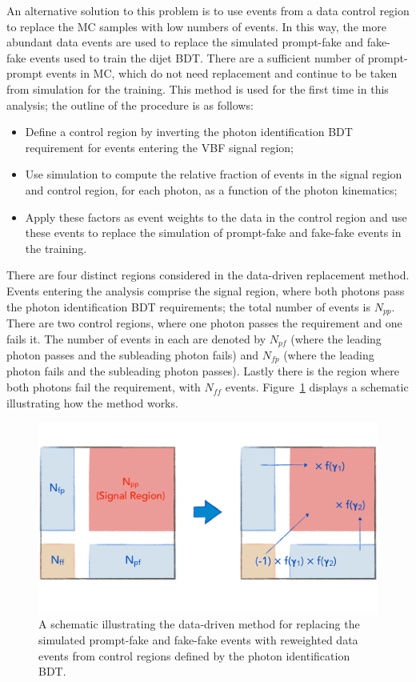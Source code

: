 An alternative solution to this problem is to use events from a data control region 
to replace the MC samples with low numbers of events.
In this way, the more abundant data events are used to replace the simulated prompt-fake and fake-fake 
events used to train the dijet BDT.
There are a sufficient number of prompt-prompt events in MC, 
which do not need replacement and continue to be taken from simulation for the training.
This method is used for the first time in this analysis;
the outline of the procedure is as follows:
\begin{itemize}
\item Define a control region by inverting the photon identification BDT requirement 
      for events entering the VBF signal region;
\item Use simulation to compute the relative fraction of events in the signal region and control region, 
      for each photon, as a function of the photon kinematics;
\item Apply these factors as event weights to the data in the control region 
      and use these events to replace the simulation of prompt-fake and fake-fake events in the training.
\end{itemize}

There are four distinct regions considered in the data-driven replacement method.
Events entering the analysis comprise the signal region, 
where both photons pass the photon identification BDT requirements;
the total number of events is $N_{pp}$.
There are two control regions, where one photon passes the requirement and one fails it.
The number of events in each are denoted by $N_{pf}$ 
(where the leading photon passes and the subleading photon fails) and $N_{fp}$ 
(where the leading photon fails and the subleading photon passes).
Lastly there is the region where both photons fail the requirement, with $N_{ff}$ events.
Figure~\ref{fig:cat_DDschematic} displays a schematic illustrating how the method works.

\begin{figure}
  \centering
  \includegraphics[width=\textwidth]{Figures/Categorisation/DDschematic.pdf}
  \caption{A schematic illustrating the data-driven method for replacing the simulated
  prompt-fake and fake-fake events with reweighted data events from control regions 
  defined by the photon identification BDT.}
  \label{fig:cat_DDschematic}
\end{figure}

